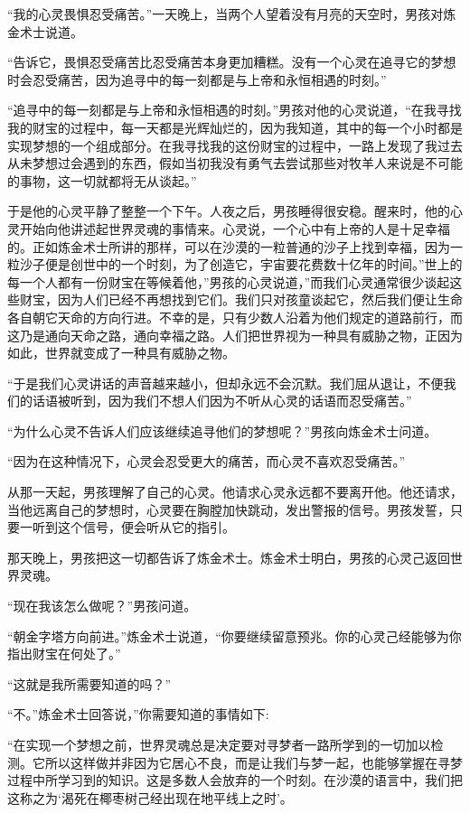 \documentclass[twoside,openany]{book}
\begin{document}
“我的心灵畏惧忍受痛苦。”一天晚上，当两个人望着没有月亮的天空时，男孩对炼金术士说道。

“告诉它，畏惧忍受痛苦比忍受痛苦本身更加糟糕。没有一个心灵在追寻它的梦想时会忍受痛苦，因为追寻中的每一刻都是与上帝和永恒相遇的时刻。”

“追寻中的每一刻都是与上帝和永恒相遇的时刻。”男孩对他的心灵说道，“在我寻找我的财宝的过程中，每一天都是光辉灿烂的，因为我知道，其中的每一个小时都是实现梦想的一个组成部分。在我寻找我的这份财宝的过程中，一路上发现了我过去从未梦想过会遇到的东西，假如当初我没有勇气去尝试那些对牧羊人来说是不可能的事物，这一切就都将无从谈起。”

于是他的心灵平静了整整一个下午。人夜之后，男孩睡得很安稳。醒来时，他的心灵开始向他讲述起世界灵魂的事情来。心灵说，一个心中有上帝的人是十足幸福的。正如炼金术士所讲的那样，可以在沙漠的一粒普通的沙子上找到幸福，因为一粒沙子便是创世中的一个时刻，为了创造它，宇宙要花费数十亿年的时间。”世上的每一个人都有一份财宝在等候着他，”男孩的心灵说道，”而我们心灵通常很少谈起这些财宝，因为人们已经不再想找到它们。我们只对孩童谈起它，然后我们便让生命各自朝它天命的方向行进。不幸的是，只有少数人沿着为他们规定的道路前行，而这乃是通向天命之路，通向幸福之路。人们把世界视为一种具有威胁之物，正因为如此，世界就变成了一种具有威胁之物。

“于是我们心灵讲话的声音越来越小，但却永远不会沉默。我们屈从退让，不便我们的话语被听到，因为我们不想人们因为不听从心灵的话语而忍受痛苦。”

“为什么心灵不告诉人们应该继续追寻他们的梦想呢？”男孩向炼金术士问道。

“因为在这种情况下，心灵会忍受更大的痛苦，而心灵不喜欢忍受痛苦。”

从那一天起，男孩理解了自己的心灵。他请求心灵永远都不要离开他。他还请求，当他远离自己的梦想时，心灵要在胸膛加快跳动，发出警报的信号。男孩发誓，只要一听到这个信号，便会听从它的指引。

那天晚上，男孩把这一切都告诉了炼金术士。炼金术士明白，男孩的心灵己返回世界灵魂。

“现在我该怎么做呢？”男孩问道。

“朝金字塔方向前进。”炼金术士说道，“你要继续留意预兆。你的心灵己经能够为你指出财宝在何处了。”

“这就是我所需要知道的吗？”

“不。”炼金术士回答说，”你需要知道的事情如下:

“在实现一个梦想之前，世界灵魂总是决定要对寻梦者一路所学到的一切加以检测。它所以这样做并非因为它居心不良，而是让我们与梦一起，也能够掌握在寻梦过程中所学习到的知识。这是多数人会放弃的一个时刻。在沙漠的语言中，我们把这称之为‘渴死在椰枣树己经出现在地平线上之时’。
\end{document}
